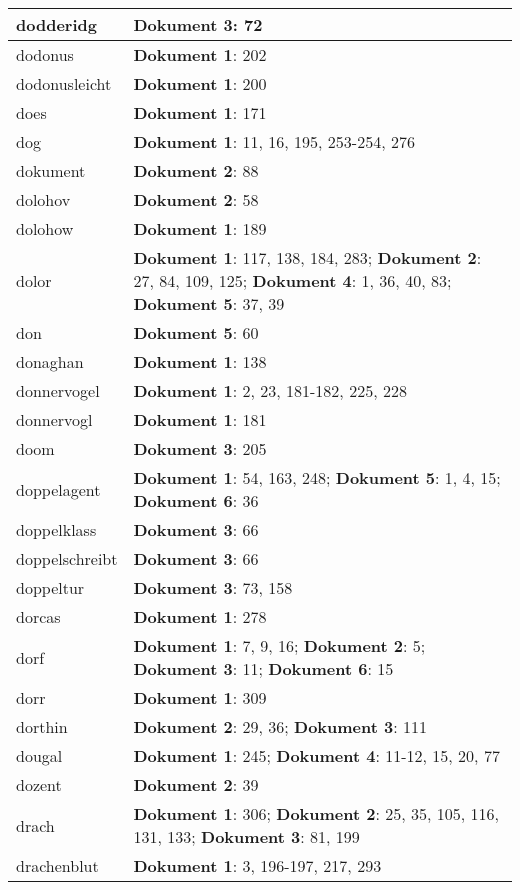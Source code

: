 \documentclass[a5paper]{article}
\begin{document}
\begin{longtable}[l]{|l|p{3in}|}
\hline
dodderidg & \textbf{Dokument 3}: 72 \\
\hline
dodonus & \textbf{Dokument 1}: 202 \\
\hline
dodonusleicht & \textbf{Dokument 1}: 200 \\
\hline
does & \textbf{Dokument 1}: 171 \\
\hline
dog & \textbf{Dokument 1}: 11, 16, 195, 253-254, 276 \\
\hline
dokument & \textbf{Dokument 2}: 88 \\
\hline
dolohov & \textbf{Dokument 2}: 58 \\
\hline
dolohow & \textbf{Dokument 1}: 189 \\
\hline
dolor & \textbf{Dokument 1}: 117, 138, 184, 283; \textbf{Dokument 2}: 27, 84, 109, 125; \textbf{Dokument 4}: 1, 36, 40, 83; \textbf{Dokument 5}: 37, 39 \\
\hline
don & \textbf{Dokument 5}: 60 \\
\hline
donaghan & \textbf{Dokument 1}: 138 \\
\hline
donnervogel & \textbf{Dokument 1}: 2, 23, 181-182, 225, 228 \\
\hline
donnervogl & \textbf{Dokument 1}: 181 \\
\hline
doom & \textbf{Dokument 3}: 205 \\
\hline
doppelagent & \textbf{Dokument 1}: 54, 163, 248; \textbf{Dokument 5}: 1, 4, 15; \textbf{Dokument 6}: 36 \\
\hline
doppelklass & \textbf{Dokument 3}: 66 \\
\hline
doppelschreibt & \textbf{Dokument 3}: 66 \\
\hline
doppeltur & \textbf{Dokument 3}: 73, 158 \\
\hline
dorcas & \textbf{Dokument 1}: 278 \\
\hline
dorf & \textbf{Dokument 1}: 7, 9, 16; \textbf{Dokument 2}: 5; \textbf{Dokument 3}: 11; \textbf{Dokument 6}: 15 \\
\hline
dorr & \textbf{Dokument 1}: 309 \\
\hline
dorthin & \textbf{Dokument 2}: 29, 36; \textbf{Dokument 3}: 111 \\
\hline
dougal & \textbf{Dokument 1}: 245; \textbf{Dokument 4}: 11-12, 15, 20, 77 \\
\hline
dozent & \textbf{Dokument 2}: 39 \\
\hline
drach & \textbf{Dokument 1}: 306; \textbf{Dokument 2}: 25, 35, 105, 116, 131, 133; \textbf{Dokument 3}: 81, 199 \\
\hline
drachenblut & \textbf{Dokument 1}: 3, 196-197, 217, 293 \\

\end{longtable}
\end{document}
